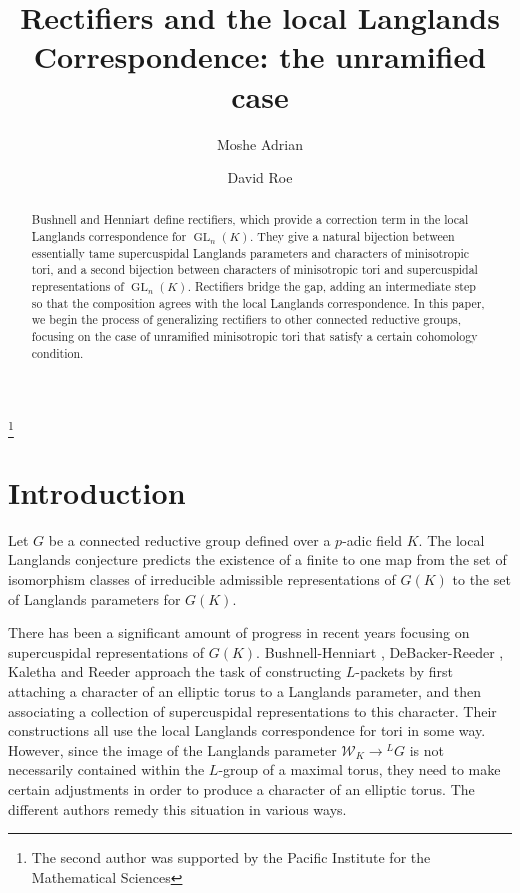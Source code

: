 \documentclass{compositio}
\theoremstyle{plain}
\theoremstyle{definition}
\numberwithin{equation}{section}
\DeclareMathOperator{\GL}{GL}
\newcommand{\Weil}{\mathcal{W}}
\begin{document}
\title[Rectifiers and the local Langlands Correspondence]{Rectifiers and the local Langlands Correspondence: the unramified case}
\author{Moshe Adrian}
\address{Department of Mathematics, University of Utah, Salt Lake City, UT 84112, U.S.A.}
\author{David Roe}
\address{Department of Mathematics, University of Calgary, Calgary, AB T2N 1N4, Canada}
\thanks{The second author was supported by the Pacific Institute for the Mathematical Sciences}


\begin{abstract}

Bushnell and Henniart define rectifiers, which provide a correction term
in the local Langlands correspondence for $\GL_n(K)$.  They give a natural bijection
between essentially tame supercuspidal Langlands parameters
and characters of minisotropic tori, and a second bijection between characters
of minisotropic tori and supercuspidal representations of $\GL_n(K)$.  Rectifiers
bridge the gap, adding an intermediate step so that the composition agrees 
with the local Langlands correspondence.
In this paper, we begin the process of generalizing rectifiers to other
connected reductive groups, focusing on the case of unramified minisotropic
tori that satisfy a certain cohomology condition.

\end{abstract}

\maketitle

\section{Introduction} \label{section:intro}

Let $G$ be a connected reductive group defined over a $p$-adic field $K$.
The local Langlands conjecture predicts the existence of a finite to one map
from the set of isomorphism classes of irreducible admissible representations
of $G(K)$ to the set of Langlands parameters for $G(K)$.

There has been a significant amount of progress in recent years
focusing on supercuspidal representations of $G(K)$.  Bushnell-Henniart \cite{bushnell-henniart:10a},
DeBacker-Reeder \cite{reeder-debacker:09a}, Kaletha \cite{kaletha:13a} and Reeder \cite{reeder:08a}
approach the task of constructing $L$-packets by first attaching
a character of an elliptic torus to a Langlands parameter, and
then associating a collection of supercuspidal representations to this character.
Their constructions all use the local Langlands correspondence for tori in some way.  However,
since the image of the Langlands parameter $\Weil_K \rightarrow {}^L G$ is not
necessarily contained within the $L$-group of a maximal torus, they need to make certain
adjustments in order to produce a character of an elliptic torus.  The different authors remedy this situation in various ways.
\end{document}
